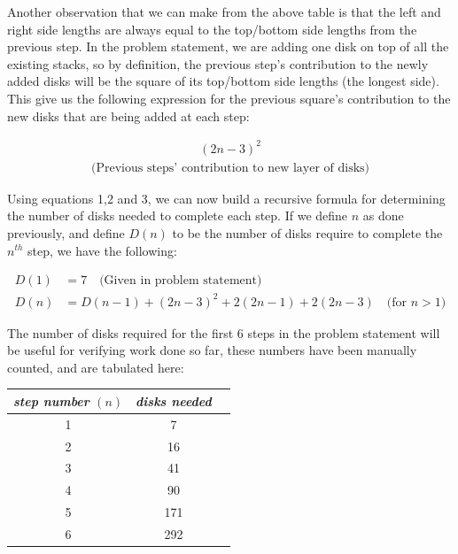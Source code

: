 \documentclass[11pt]{article}
\begin{document}
	\newpage

	Another observation that we can make from the above table is that the left and right side lengths are always equal to the top/bottom
	side lengths from the previous step.  In the problem statement, we are adding one disk on top of all the existing stacks, so by definition, the previous step's contribution to the newly
	added disks will be the square of its top/bottom side lengths (the longest side).  This give us the following expression for the previous square's contribution to the new disks that are being
	added at each step:
	\begin{center}
		\begin{align}
			(2n-3)^2
		\end{align}
		\begin{align*}
			\text{(Previous steps' contribution to new layer of disks)}
		\end{align*}
	\end{center}

	Using equations 1,2 and 3, we can now build a recursive formula for determining the number of disks needed to complete each step.  If we define $n$ as done previously, and define 
	$D(n)$ to be the number of disks require to complete the $n^{th}$ step, we have the following:
	 	
	\begin{align}
		D(1)&=7 \quad \text{(Given in problem statement)}\\
		D(n)&= D(n-1)+(2n-3)^2+2(2n-1)+2(2n-3) \quad \text{(for $n>1$)}
	\end{align}

	The number of disks required for the first 6 steps in the problem statement will be useful for verifying work done so far, these numbers have been manually counted, and are
	tabulated here:

	\begin{center}
		\begin{tabular}{|c|c|c|}	\hline\hline
			\emph{step number } $(n)$ &
			\emph{disks needed} \\ \hline
			1	&7	\\
			2	&16	\\
			3	&41	\\
			4	&90	\\
			5	&171 	\\
			6	&292	\\ \hline \hline
		\end{tabular}
	\end{center}
\end{document}
